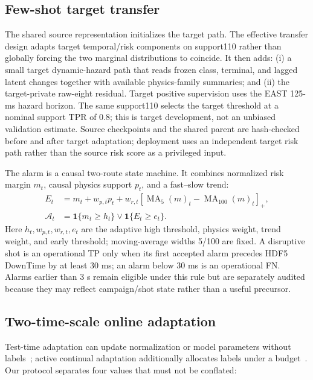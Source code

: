 \documentclass[10pt,twocolumn]{article}
\newcommand{\east}{EAST}
\begin{document}
\subsection{Few-shot target transfer}

The shared source representation initializes the target path.  The effective transfer design adapts target temporal/risk components on support110 rather than globally forcing the two marginal distributions to coincide.  It then adds: (i) a small target dynamic-hazard path that reads frozen class, terminal, and lagged latent changes together with available physics-family summaries; and (ii) the target-private raw-eight residual.  Target positive supervision uses the \east{} 125-ms hazard horizon.  The same support110 selects the target threshold at a nominal support TPR of 0.8; this is target development, not an unbiased validation estimate.  Source checkpoints and the shared parent are hash-checked before and after target adaptation; deployment uses an independent target risk path rather than the source risk score as a privileged input.

The alarm is a causal two-route state machine.  It combines normalized risk margin $m_t$, causal physics support $p_t$, and a fast--slow trend:
\begin{equation}
\begin{aligned}
E_t &= m_t+w_{p,t}p_t
+w_{r,t}[\operatorname{MA}_{5}(m)_t-\operatorname{MA}_{100}(m)_t]_+,\\
\mathcal A_t&=\mathbf{1}\{m_t\ge h_t\}\lor\mathbf{1}\{E_t\ge e_t\}.
\end{aligned}
\label{eq:alarm}
\end{equation}
Here $h_t,w_{p,t},w_{r,t},e_t$ are the adaptive high threshold, physics weight, trend weight, and early threshold; moving-average widths 5/100 are fixed.  A disruptive shot is an operational TP only when its first accepted alarm precedes HDF5 DownTime by at least 30 ms; an alarm below 30 ms is an operational FN.  Alarms earlier than 3 s remain eligible under this rule but are separately audited because they may reflect campaign/shot state rather than a useful precursor.

\subsection{Two-time-scale online adaptation}

Test-time adaptation can update normalization or model parameters without labels~\citep{wang2021tent,niu2022eata,wang2022cotta}; active continual adaptation additionally allocates labels under a budget~\citep{zhou2022online}.  Our protocol separates four values that must not be conflated:
\end{document}
